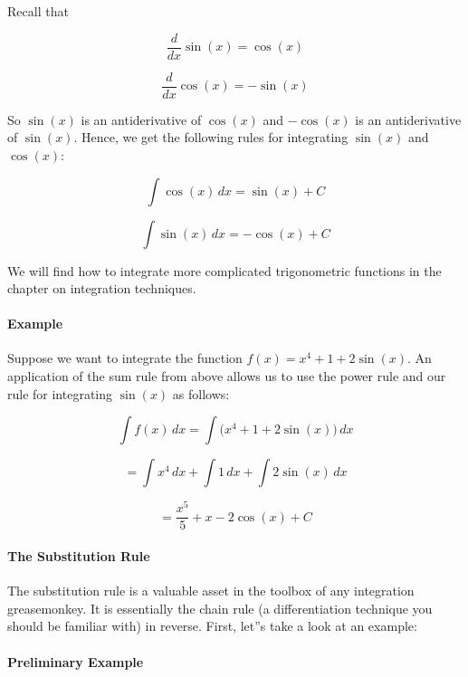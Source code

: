 Recall that



$$\frac{d}{dx} \sin(x) = \cos(x)$$  

$$\frac{d}{dx} \cos(x) = -\sin(x)$$



So $\sin(x)$ is an antiderivative of $\cos(x)$ and $-\cos(x)$ is an antiderivative of $\sin(x)$. Hence, we get the following rules for integrating $\sin(x)$ and $\cos(x)$:



$$\int \cos(x) \, dx = \sin(x) + C$$  

$$\int \sin(x) \, dx = -\cos(x) + C$$



We will find how to integrate more complicated trigonometric functions in the chapter on integration techniques.



\paragraph{Example}



Suppose we want to integrate the function $f(x) = x^4 + 1 + 2\sin(x)$. An application of the sum rule from above allows us to use the power rule and our rule for integrating $\sin(x)$ as follows:



$$\int f(x) \, dx = \int \Big(x^4 + 1 + 2\sin(x)\Big) \, dx$$  

$$= \int x^4 \, dx + \int 1 \, dx + \int 2\sin(x) \, dx$$  

$$= \frac{x^5}{5} + x - 2\cos(x) + C$$



\paragraph{The Substitution Rule}



The substitution rule is a valuable asset in the toolbox of any integration greasemonkey. It is essentially the chain rule (a differentiation technique you should be familiar with) in reverse. First, let''s take a look at an example:



\paragraph{Preliminary Example}



